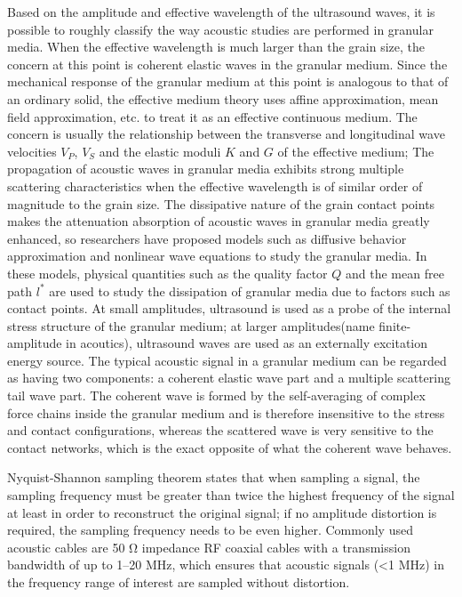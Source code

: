 \begin{digest}
    Based on the amplitude and effective wavelength of the ultrasound waves, it is possible to roughly classify the way acoustic studies are performed in granular media.
    When the effective wavelength is much larger than the grain size, the concern at this point is coherent elastic waves in the granular medium.
    Since the mechanical response of the granular medium at this point is analogous to that of an ordinary solid, the effective medium theory uses affine approximation, mean field approximation, etc. to treat it as an effective continuous medium. The concern is usually the relationship between the transverse and longitudinal wave velocities $V_{P}$, $V_{S}$ and the elastic moduli $K$ and $G$ of the effective medium;
    The propagation of acoustic waves in granular media exhibits strong multiple scattering characteristics when the effective wavelength is of similar order of magnitude to the grain size. The dissipative nature of the grain contact points makes the attenuation absorption of acoustic waves in granular media greatly enhanced, so researchers have proposed models such as diffusive behavior approximation and nonlinear wave equations to study the granular media.
    In these models, physical quantities such as the quality factor $Q$ and the mean free path $l^{*}$ are used to study the dissipation of granular media due to factors such as contact points. At small amplitudes, ultrasound is used as a probe of the internal stress structure of the granular medium; at larger amplitudes(name finite-amplitude in acoutics), ultrasound waves are used as an externally excitation energy source. 
    The typical acoustic signal in a granular medium can be regarded as having two components: a coherent elastic wave part and a multiple scattering tail wave part. The coherent wave is formed by the self-averaging of complex force chains inside the granular medium and is therefore insensitive to the stress and contact configurations, whereas the scattered wave is very sensitive to the contact networks, which is the exact opposite of what the coherent wave behaves.
    

    Nyquist-Shannon sampling theorem states that when sampling a signal, the sampling frequency must be greater than twice the highest frequency of the signal at least in order to reconstruct the original signal; if no amplitude distortion is required, the sampling frequency needs to be even higher. 
    Commonly used acoustic cables are 50 \unit{\ohm} impedance RF coaxial cables with a transmission bandwidth of up to \numrange{1}{20} \unit{\mega\hertz}, which ensures that acoustic signals (<1 \unit{\mega\hertz}) in the frequency range of interest are sampled without distortion.


\end{digest}
